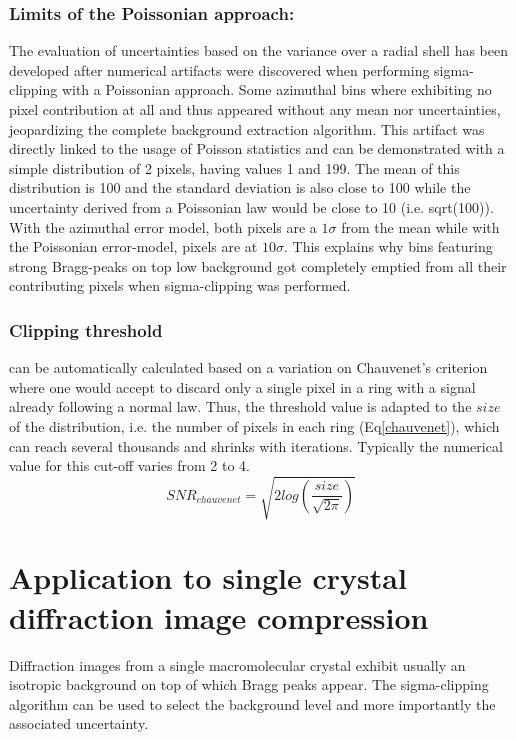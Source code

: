 \documentclass[a4paper,12pt,oneside]{article}              %
\begin{document}
\subsubsection{Limits of the Poissonian approach:}
The evaluation of uncertainties based on the variance over a radial shell has been developed after numerical artifacts were discovered when performing sigma-clipping with a Poissonian approach. Some azimuthal bins where exhibiting no pixel contribution at all and thus appeared without any mean nor uncertainties, jeopardizing the complete background extraction algorithm. 
This artifact was directly linked to the usage of Poisson statistics and can be demonstrated with a simple distribution of 2 pixels, having values 1 and 199. 
The mean of this distribution is 100 and the standard deviation is also close to 100 while the uncertainty derived from a Poissonian law would  be close to 10 (i.e. sqrt(100)). 
With the azimuthal error model, both pixels are a $1\sigma$ from the mean while with the Poissonian error-model, pixels are at $10 \sigma$.  
This explains why bins featuring strong Bragg-peaks on top low background got completely emptied from all their contributing pixels when sigma-clipping was performed.

\subsubsection{Clipping threshold}
can be automatically calculated based on a variation on Chauvenet's criterion \cite{chauvenet} where one would accept to discard only a single pixel in a ring with a signal already following a normal law. 
Thus, the threshold value is adapted to the $size$ of the distribution, i.e. the number of pixels in each ring (Eq\ref{chauvenet}), which can reach several thousands and shrinks with iterations.
Typically the numerical value for this cut-off varies from 2 to 4.   
\begin{equation}
\label{chauvenet}
SNR_{chauvenet} =  \sqrt{2 log(\frac{size}{\sqrt{2 \pi}})}
\end{equation}

\section{Application to single crystal diffraction image compression}
Diffraction images from a single macromolecular crystal exhibit usually an isotropic background on top of which Bragg peaks appear.
The sigma-clipping algorithm can be used to select the background level and more importantly the associated uncertainty.
\end{document}
